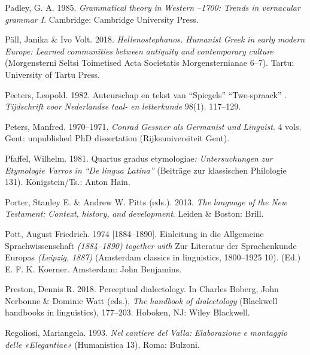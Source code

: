 \documentclass[output=paper]{langsci/langscibook}
\begin{document}
Padley, G. A. 1985. \textit{Grammatical} \textit{theory} \textit{in} \textit{Western} \textit{\citealt{Europe1500}–1700: Trends in vernacular grammar I}. Cambridge: Cambridge University Press.

Päll, Janika \& Ivo Volt. 2018. \textit{Hellenostephanos.} \textit{Humanist} \textit{Greek} \textit{in} \textit{early} \textit{modern} \textit{Europe:} \textit{Learned} \textit{communities} \textit{between} \textit{antiquity} \textit{and} \textit{contemporary} \textit{culture} (Morgensterni Seltsi Toimetised {\textbar} Acta Societatis Morgensternianae 6–7). Tartu: University of Tartu Press.

Peeters, Leopold. 1982. Auteurschap en tekst van “Spiegels” “Twe-spraack” . \textit{Tijdschrift} \textit{voor} \textit{Nederlandse} \textit{taal-} \textit{en} \textit{letterkunde} 98(1). 117–129.

Peters, Manfred. 1970–1971. \textit{Conrad} \textit{Gessner} \textit{als} \textit{Germanist} \textit{und} \textit{Linguist}. 4 vols. Gent: unpublished PhD dissertation (Rijksuniversiteit Gent).

Pfaffel, Wilhelm. 1981. Quartus gradus etymologiae\textit{:} \textit{Untersuchungen} \textit{zur} \textit{Etymologie} \textit{Varros} \textit{in} \textit{“De} \textit{lingua} \textit{Latina”} (Beiträge zur klassischen Philologie 131). Königstein/Ts.: Anton Hain.

Porter, Stanley E. \& Andrew W. Pitts (eds.). 2013. \textit{The} \textit{language} \textit{of} \textit{the} \textit{New} \textit{Testament:} \textit{Context,} \textit{history,} \textit{and} \textit{development}. Leiden \& Boston: Brill.

Pott, August Friedrich. 1974 [1884–1890]. Einleitung in die Allgemeine Sprachwissenschaft \textit{(1884–1890)} \textit{together} \textit{with} Zur Literatur der Sprachenkunde Europas \textit{(Leipzig,} \textit{1887)} (Amsterdam classics in linguistics, 1800–1925 10). (Ed.) E. F. K. Koerner. Amsterdam: John Benjamins.

Preston, Dennis R. 2018. Perceptual dialectology. In Charles Boberg, John Nerbonne \& Dominic Watt (eds.), \textit{The} \textit{handbook} \textit{of} \textit{dialectology} (Blackwell handbooks in linguistics), 177–203. Hoboken, NJ: Wiley Blackwell.

Regoliosi, Mariangela. 1993. \textit{Nel} \textit{cantiere} \textit{del} \textit{Valla:} \textit{Elaborazione} \textit{e} \textit{montaggio} \textit{delle} \textit{«Elegantiae»} (Humanistica 13). Roma: Bulzoni.
\end{document}

